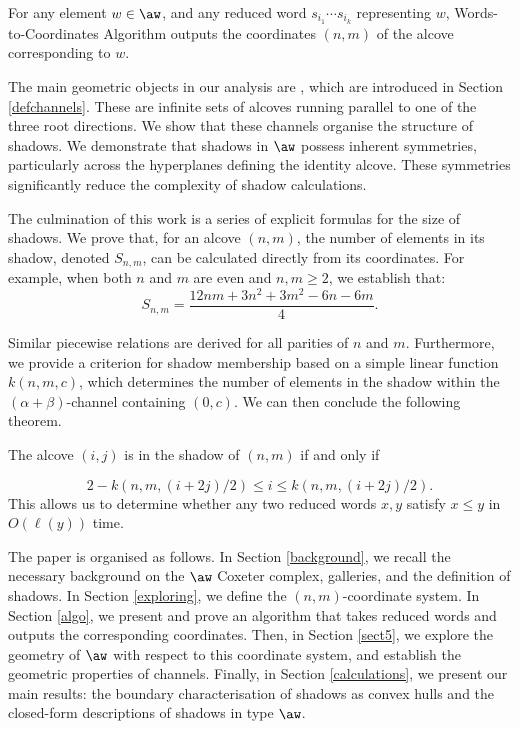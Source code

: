 \documentclass[11pt]{article}
\begin{document}
\begin{theorem}
    For any element $w\in \aw$, and any reduced word $s_{i_1}\cdots s_{i_k}$ representing $w$, Words-to-Coordinates Algorithm outputs the coordinates $(n,m)$ of the alcove corresponding to $w$. 
\end{theorem}


The main geometric objects in our analysis are , which are introduced in Section \ref{defchannels}. These are infinite sets of alcoves running parallel to one of the three root directions. We show that these channels organise the structure of shadows. We demonstrate that shadows in $\aw$ possess inherent symmetries, particularly across the hyperplanes defining the identity alcove. These symmetries significantly reduce the complexity of shadow calculations. 

The culmination of this work is a series of explicit formulas for the size of shadows. We prove that, for an alcove $(n, m)$, the number of elements in its shadow, denoted $S_{n,m}$, can be calculated directly from its coordinates. For example, when both $n$ and $m$ are even and $n,m \geq 2$, we establish that:
\[
S_{n,m} = \frac{12nm + 3n^2 + 3m^2 - 6n - 6m}{4}.
\]



Similar piecewise relations are derived for all parities of $n$ and $m$. Furthermore, we provide a criterion for shadow membership based on a simple linear function $k(n, m, c)$, which determines the number of elements in the shadow within the $(\alpha+\beta)$-channel containing $(0,c)$. We can then conclude the following theorem.

\begin{theorem}
The alcove $(i,j)$ is in the shadow of $(n,m)$ if and only if 

    \[2-k(n,m,({i+2j})/{2})\leq i \leq k(n,m,({i+2j})/{2}).\]
    This allows us to determine whether any two reduced words $x,y$ satisfy $x\leq y$ in $O(\ell(y))$ time. 
\end{theorem}

The paper is organised as follows. In Section \ref{background}, we recall the necessary background on the $\aw$ Coxeter complex, galleries, and the definition of shadows. In Section \ref{exploring}, we define the $(n, m)$-coordinate system. In Section \ref{algo}, we present and prove an algorithm that takes reduced words and outputs the corresponding coordinates. Then, in Section \ref{sect5}, we explore the geometry of $\aw$ with respect to this coordinate system, and establish the geometric properties of channels. Finally, in Section \ref{calculations}, we present our main results: the boundary characterisation of shadows as convex hulls and the closed-form descriptions of shadows in type $\aw$.
\end{document}

